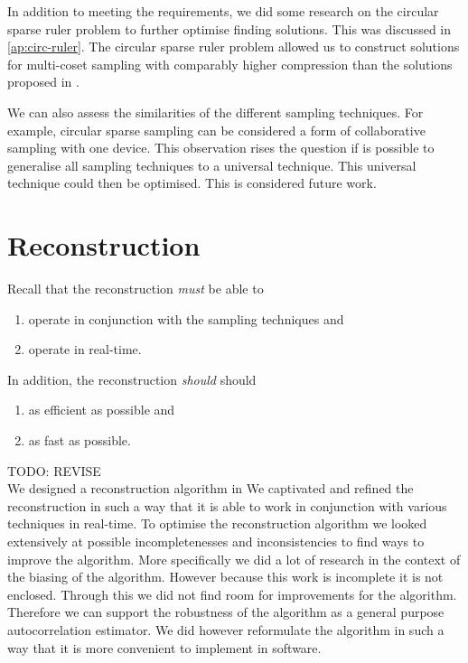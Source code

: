 \documentclass[a4paper, openany, oneside]{memoir}
\begin{document}
In addition to meeting the requirements, we did some research on the circular sparse ruler problem to further optimise finding solutions. This was discussed in \cref{ap:circ-ruler}. The circular sparse ruler problem allowed us to construct solutions for multi-coset sampling with comparably higher compression than the solutions proposed in \cite{ariananda2012compressive}.


We can also assess the similarities of the different sampling techniques. For example, circular sparse sampling can be considered a form of collaborative sampling with one device. This observation rises the question if is possible to generalise all sampling techniques to a universal technique. This universal technique could then be optimised. This is considered future work.  


\section{Reconstruction}
Recall that the reconstruction \textit{must} be able to
\begin{enumerate}
    \item operate in conjunction with the sampling techniques and
    \item operate in real-time.
\end{enumerate}
In addition, the reconstruction \textit{should} should
\begin{enumerate}
    \item as efficient as possible and
    \item as fast as possible.
\end{enumerate}

TODO: REVISE \\
We designed a reconstruction algorithm in
We captivated and refined the reconstruction in such a way that it is able to work in conjunction with various techniques in real-time. To optimise the reconstruction algorithm we looked extensively at possible incompletenesses and inconsistencies to find ways to improve the algorithm. More specifically we did a lot of research in the context of the biasing of the algorithm. However because this work is incomplete it is not enclosed.  Through this we did not find room for improvements for the algorithm. Therefore we can support the robustness of the algorithm as a general purpose autocorrelation estimator. We did however reformulate the algorithm in such a way that it is more convenient to implement in software.
\end{document}
